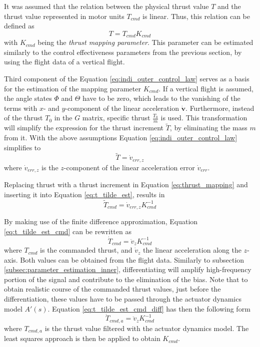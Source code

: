 \documentclass[11pt, a4paper, twoside]{report}
\begin{document}
It was assumed that the relation between the physical thrust value $T$ and the thrust value represented in motor units $T_{cmd}$ is linear. Thus, this relation can be defined as
\begin{equation}
	T = T_{cmd} K_{cmd}
	\label{eq:thrust_mapping}
\end{equation}
with $K_{cmd}$ being the \textit{thrust mapping parameter}. This parameter can be estimated similarly to the control effectiveness parameters from the previous section, by using the flight data of a vertical flight.

Third component of the Equation \ref{eq:indi_outer_control_law} serves as a basis for the estimation of the mapping parameter $K_{cmd}$. If a vertical flight is assumed, the angle states $\Phi$ and $\Theta$ have to be zero, which leads to the vanishing of the terms with $x$- and $y$-component of the linear acceleration $\bm{\dot{v}}$. Furthermore, instead of the thrust $T_0$ in the $G$ matrix, specific thrust $\frac{T_0}{m}$ is used. This transformation will simplify the expression for the thrust increment $\tilde{T}$, by eliminating the mass $m$ from it. With the above assumptions Equation \ref{eq:indi_outer_control_law}  simplifies to 
\begin{equation}
	\tilde{T} = \dot{v}_{err,z}
	\label{eq:t_tilde_est}
\end{equation}
where $\dot{v}_{err,z}$ is the $z$-component of the linear acceleration error $\dot{v}_{err}$.

Replacing thrust with a thrust increment in Equation \ref{eq:thrust_mapping} and inserting it into Equation \ref{eq:t_tilde_est}, results in
\begin{equation}
	\tilde{T}_{cmd} = \dot{v}_{err,z} K_{cmd}^{-1}
	\label{eq:t_tilde_est_cmd}
\end{equation}

By making use of the finite difference approximation, Equation \ref{eq:t_tilde_est_cmd} can be rewritten as
\begin{equation}
	\dot{T}_{cmd} = \ddot{v}_{z} K_{cmd}^{-1}
	\label{eq:t_tilde_est_cmd_diff}
\end{equation}
where $T_{cmd}$ is the commanded thrust, and $\dot{v}_{z}$ the linear acceleration along the $z$-axis. Both values can be obtained from the flight data. Similarly to subsection \ref{subsec:parameter_estimation_inner}, differentiating will amplify high-frequency portion of the signal and contribute to the elimination of the bias. Note that to obtain realistic course of the commanded thrust values, just before the differentiation, these values have to be passed through the actuator dynamics model $A'(s)$. Equation \ref{eq:t_tilde_est_cmd_diff} has then the following form 
\begin{equation}
	\dot{T}_{cmd, a} = \ddot{v}_{z} K_{cmd}^{-1}
	\label{eq:t_tilde_est_cmd_diff_actuator}
\end{equation}
where $T_{cmd, a}$ is the thrust value filtered with the actuator dynamics model. The least squares approach is then be applied to obtain $K_{cmd}$.
\end{document}
